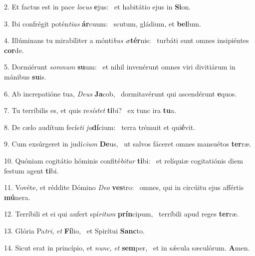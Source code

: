 2. Et factus est in pace \textit{lo}\textit{cus} \textbf{e}jus: \ast\  et habitátio ejus in \textbf{Si}on.\

3. Ibi confrégit potén\textit{ti}\textit{as} \textbf{ár}cuum: \ast\  scutum, gládium, et \textbf{bel}lum.\

4. Illúminans tu mirabíliter a mónti\textit{bus} \textit{æ}\textbf{tér}nis: \ast\  turbáti sunt omnes insipiéntes \textbf{cor}de.\

5. Dormiérunt \textit{som}\textit{num} \textbf{su}um: \ast\  et nihil invenérunt omnes viri divitiárum in mánibus \textbf{su}is.\

6. Ab increpatióne tua, \textit{De}\textit{us} \textbf{Ja}cob, \ast\  dormitavérunt qui ascendérunt \textbf{e}quos.\

7. Tu terríbilis es, et quis re\textit{sís}\textit{tet} \textbf{ti}bi? \ast\  ex tunc ira \textbf{tu}a.\

8. De cælo audítum fecís\textit{ti} \textit{ju}\textbf{dí}cium: \ast\  terra trémuit et qui\textbf{é}vit.\

9. Cum exsúrgeret in judí\textit{ci}\textit{um} \textbf{De}us, \ast\  ut salvos fáceret omnes mansuétos \textbf{ter}ræ.\

10. Quóniam cogitátio hóminis confité\textit{bi}\textit{tur} \textbf{ti}bi: \ast\  et relíquiæ cogitatiónis diem festum agent \textbf{ti}bi.\

11. Vovéte, et réddite Dómino \textit{De}\textit{o} \textbf{ves}tro: \ast\  omnes, qui in circúitu ejus affértis \textbf{mú}nera.\

12. Terríbili et ei qui aufert spí\textit{ri}\textit{tum} \textbf{prín}cipum, \ast\  terríbili apud reges \textbf{ter}ræ.\

13. Glória Pa\textit{tri}, \textit{et} \textbf{Fí}lio, \ast\  et Spirítui \textbf{Sanc}to.\

14. Sicut erat in princípio, et \textit{nunc}, \textit{et} \textbf{sem}per, \ast\  et in sǽcula sæculórum. \textbf{A}men.\


